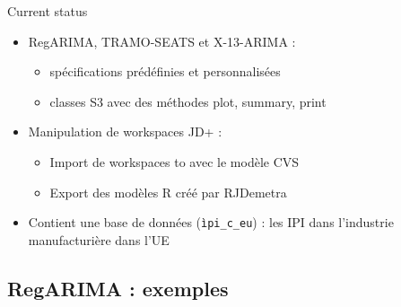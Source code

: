 \documentclass[10pt,xcolor=table,color={dvipsnames,usenames},ignorenonframetext,usepdftitle=false,french]{beamer}
\providecommand{\tightlist}{%
  \setlength{\parskip}{0pt}
  }
\begin{document}
\begin{frame}[fragile]{Current status}
\protect\hypertarget{current-status-1}{}

\begin{itemize}
\tightlist
\item
  RegARIMA, TRAMO-SEATS et X-13-ARIMA :

  \begin{itemize}
  \tightlist
  \item
    spécifications prédéfinies et personnalisées
  \item
    classes S3 avec des méthodes plot, summary, print
  \end{itemize}
\end{itemize}

\medskip

\begin{itemize}
\tightlist
\item
  Manipulation de workspaces JD+ :

  \begin{itemize}
  \tightlist
  \item
    Import de workspaces to avec le modèle CVS
  \item
    Export des modèles R créé par RJDemetra
  \end{itemize}
\end{itemize}

\medskip

\begin{itemize}
\tightlist
\item
  Contient une base de données (\texttt{ìpi\_c\_eu}) : les IPI dans
  l'industrie manufacturière dans l'UE
\end{itemize}

\end{frame}

\hypertarget{regarima-exemples}{%
\subsection{RegARIMA : exemples}\label{regarima-exemples}}
\end{document}
